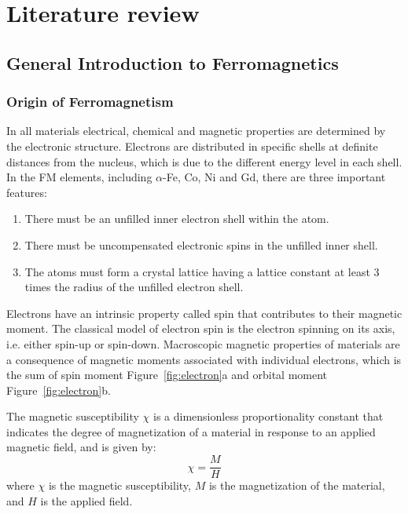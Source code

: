 \chapter{Literature review}
\section{General Introduction to Ferromagnetics}

\subsection{Origin of Ferromagnetism}
In all materials electrical, chemical and magnetic properties are determined by the electronic structure. Electrons are distributed in specific shells at definite distances from the nucleus, which is due to the different energy level in each shell. In the FM elements, including $\alpha$-Fe, Co, Ni and Gd, there are three important features:

\begin{enumerate}
\item There must be an unfilled inner electron shell within the atom.
\item There must be uncompensated electronic spins in the unfilled inner shell.
\item The atoms must form a crystal lattice having a lattice constant at least 3
times the radius of the unfilled electron shell.
\end{enumerate}

Electrons have an intrinsic property called spin that contributes to their magnetic moment. The classical model of electron spin is the electron spinning on its
axis, i.e. either spin-up or spin-down. Macroscopic magnetic properties of materials are a consequence of magnetic moments associated with individual electrons, which is the sum of spin moment Figure~\ref{fig:electron}a and orbital moment Figure~\ref{fig:electron}b.

The magnetic susceptibility $\chi$ is a dimensionless proportionality
constant that indicates the degree of magnetization of a material in response to an applied magnetic field, and is given by:
\begin{equation}
\chi = \frac{M}{H}
\end{equation}
where $\chi$ is the magnetic susceptibility, $M$ is the magnetization of the material, and $H$ is the applied field.

